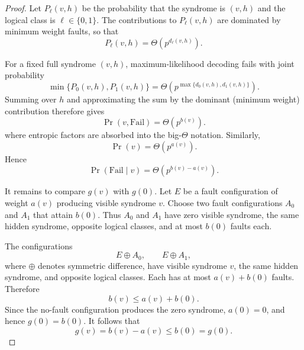 \documentclass[
    reprint,
    amsmath,amssymb,
    nofootinbib,
    superscriptaddress,
    aps,
    noeprint,
    longbibliography,
    prl
]{revtex4-2}
\theoremstyle{plain}
\begin{document}
\begin{proof}
    Let \(P_\ell(v,h)\) be the probability that the syndrome is \((v,h)\) and the logical class is
    \(\ell \in \{0,1\}\). The contributions to \(P_\ell(v,h)\) are dominated by minimum weight
    faults, so that
    \begin{equation}
        P_\ell(v,h)
        =
        \Theta\!\left(p^{d_\ell(v,h)}\right).
    \end{equation}

    For a fixed full syndrome \((v,h)\), maximum-likelihood decoding fails with joint
    probability
    \begin{equation}
        \min\{P_0(v,h),P_1(v,h)\}
        =
        \Theta\!\left(
        p^{\max\{d_0(v,h),d_1(v,h)\}}
        \right).
    \end{equation}
    Summing over \(h\) and approximating the sum by the dominant (minimum weight) contribution
    therefore gives
    \begin{equation}
        \Pr(v,\mathrm{Fail})
        =
        \Theta\!\left(p^{b(v)}\right).
    \end{equation}
    where entropic factors are absorbed into the big-$\Theta$ notation. Similarly,
    \begin{equation}
        \Pr(v)
        =
        \Theta\!\left(p^{a(v)}\right).
    \end{equation}
    Hence
    \begin{equation}
        \Pr(\mathrm{Fail}\mid v)
        =
        \Theta\!\left(p^{b(v)-a(v)}\right).
    \end{equation}

    It remains to compare \(g(v)\) with \(g(0)\). Let \(E\) be a fault configuration of weight
    \(a(v)\) producing visible syndrome \(v\). Choose two fault configurations \(A_0\) and \(A_1\)
    that attain \(b(0)\). Thus \(A_0\) and \(A_1\) have zero visible syndrome, the same hidden
    syndrome, opposite logical classes, and at most \(b(0)\) faults each.

    The configurations
    \begin{equation}
        E\mathbin{\oplus}A_0,
        \qquad
        E\mathbin{\oplus}A_1,
    \end{equation}
    where $\oplus$ denotes symmetric difference, have visible syndrome \(v\), the same hidden
    syndrome, and opposite logical classes. Each has at most \(a(v)+b(0)\) faults. Therefore
    \begin{equation}
        b(v)\leq a(v)+b(0).
    \end{equation}
    Since the no-fault configuration produces the zero syndrome, \(a(0)=0\), and hence
    \(g(0)=b(0)\). It follows that
    \begin{equation}
        g(v)=b(v)-a(v)\leq b(0)=g(0).
    \end{equation}
\end{proof}
\end{document}
